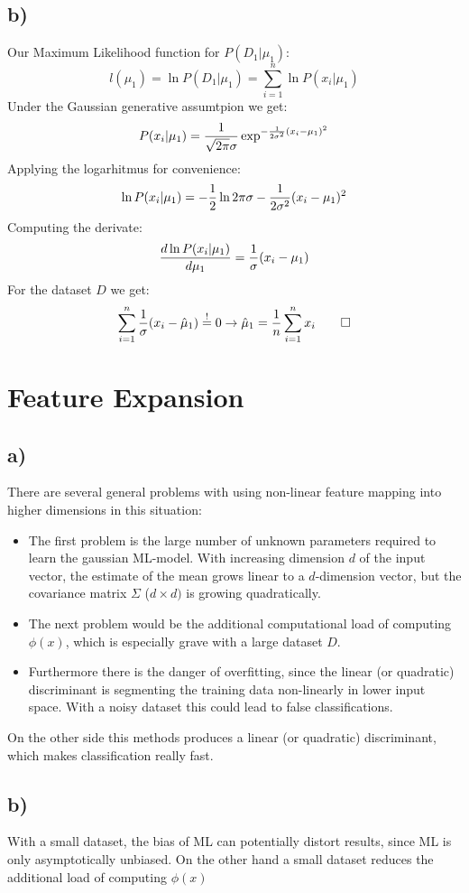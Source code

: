 \documentclass[paper=a4,fontsize=10pt,DIV11,BCOR10mm]{scrartcl}
\begin{document}
\subsection*{b)}
	Our Maximum Likelihood function for $P(D_1|\mu_1)$:
	\[
	l(\mu_1) = \ln P(D_1|\mu_1) = \sum_{i=1}^n \ln P(x_i|\mu_1)
	\]
	Under the Gaussian generative assumtpion we get:
	\[
		P(x_i|\mu_1) = \frac{1}{\sqrt{2\pi}\sigma}\exp^{-\frac{1}{2\sigma^2}(x_i-\mu_1)^2}\\
	\]
	Applying the logarhitmus for convenience:
	\[
		\ln P(x_i|\mu_1) =-\frac{1}{2} \ln 2\pi \sigma -\frac{1}{2\sigma^2}(x_i-\mu_1)^2\\
	\]
	Computing the derivate:
	\[	
		\frac{d \ln P(x_i|\mu_1)}{d \mu_1} = \frac{1}{\sigma}(x_i- \mu_1)\\
	\]
	For the dataset $D$ we get:
	\[
		\sum_{i=1}^n \frac{1}{\sigma}(x_i- \hat{\mu}_1) \stackrel{!}{=} 0\\
	\rightarrow \hat{\mu}_1=\frac{1}{n} \sum_{i=1}^n x_i \qed
	\]
\section{Feature Expansion}
	\subsection*{a)} There are several general problems with using non-linear feature mapping into higher dimensions in this situation:
	\begin{itemize}
	\item The first problem is the large number of unknown parameters required to learn the gaussian ML-model. With increasing dimension $d$ of the input vector, the estimate of the mean grows linear to a $d$-dimension vector, but the covariance matrix $\Sigma$ ($d \times d)$ is growing quadratically.
	\item The next problem would be the additional computational load of computing $\phi(x)$, which is especially grave with a large dataset $D$.
	\item Furthermore there is the danger of overfitting, since the linear (or quadratic) discriminant is segmenting the training data non-linearly in lower input space. With a noisy dataset this could lead to false classifications.
	\end{itemize}
	On the other side this methods produces a linear (or quadratic) discriminant, which makes classification really fast.
	
	\subsection*{b)}
	With a small dataset, the bias of ML can potentially distort results, since ML is only asymptotically unbiased. On the other hand a small dataset reduces the additional load of computing $\phi(x)$
	
\end{document}
